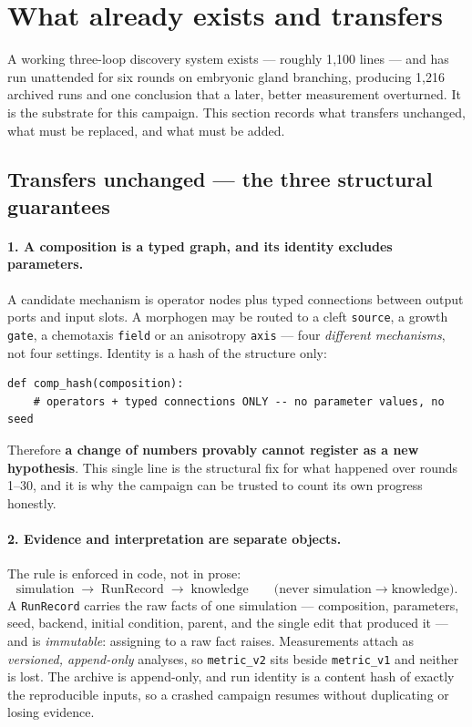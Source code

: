 \documentclass[11pt]{article}
\newcommand{\code}[1]{\texttt{#1}}
\begin{document}
\section{What already exists and transfers}
\label{sec:have}

A working three-loop discovery system exists --- roughly 1{,}100 lines --- and has run unattended
for six rounds on embryonic gland branching, producing 1{,}216 archived runs and one conclusion
that a later, better measurement overturned. It is the substrate for this campaign. This section
records what transfers unchanged, what must be replaced, and what must be added.

\subsection{Transfers unchanged --- the three structural guarantees}

\paragraph{1. A composition is a typed graph, and its identity excludes parameters.}
A candidate mechanism is operator nodes plus typed connections between output ports and input
slots. A morphogen may be routed to a cleft \code{source}, a growth \code{gate}, a chemotaxis
\code{field} or an anisotropy \code{axis} --- four \emph{different mechanisms}, not four settings.
Identity is a hash of the structure only:

\begin{lstlisting}
def comp_hash(composition):
    # operators + typed connections ONLY -- no parameter values, no seed
\end{lstlisting}

Therefore \textbf{a change of numbers provably cannot register as a new hypothesis}. This single
line is the structural fix for what happened over rounds 1--30, and it is why the campaign can be
trusted to count its own progress honestly.

\paragraph{2. Evidence and interpretation are separate objects.}
The rule is enforced in code, not in prose:
\[
\text{simulation} \;\longrightarrow\; \text{RunRecord} \;\longrightarrow\; \text{knowledge}
\qquad \text{(never simulation}\longrightarrow\text{knowledge).}
\]
A \code{RunRecord} carries the raw facts of one simulation --- composition, parameters, seed,
backend, initial condition, parent, and the single edit that produced it --- and is
\emph{immutable}: assigning to a raw fact raises. Measurements attach as \emph{versioned,
append-only} analyses, so \code{metric\_v2} sits beside \code{metric\_v1} and neither is lost. The
archive is append-only, and run identity is a content hash of exactly the reproducible inputs, so
a crashed campaign resumes without duplicating or losing evidence.
\end{document}
